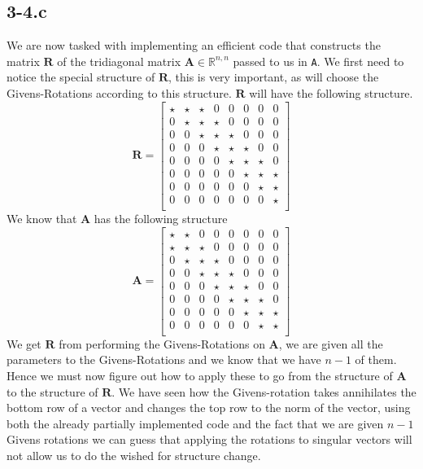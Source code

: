 \documentclass{article}
\begin{document}
\subsection*{3-4.c}
We are now tasked with implementing an efficient code that constructs the matrix $\mathbf{R}$ of the tridiagonal matrix $\mathbf{A} \in \mathbb{R}^{n,n}$ passed to us in \verb|A|. We first need to notice the special structure of $\mathbf{R}$, this is very important, as will choose the Givens-Rotations according to this structure. $\mathbf{R}$ will have the following structure.
\begin{equation*}
\mathbf{R} =
    \begin{bmatrix}
        \star & \star & \star & 0 & 0 & 0 & 0 & 0 \\
        0 & \star & \star & \star & 0 & 0 & 0 & 0 \\
        0 & 0 & \star & \star & \star & 0 & 0 & 0 \\
        0 & 0 & 0 & \star & \star & \star & 0 & 0 \\
         0 & 0 & 0 & 0 & \star & \star & \star & 0 \\
         0 & 0 & 0 & 0 & 0 & \star & \star & \star \\
         0 & 0 & 0 & 0 & 0 & 0& \star & \star \\
         0 & 0 & 0 & 0 & 0 & 0& 0 & \star \\
    \end{bmatrix}
\end{equation*}
We know that $\mathbf{A}$ has the following structure
\begin{equation*}
    \mathbf{A} = 
    \begin{bmatrix}
    \star & \star &0 & 0 & 0 & 0 & 0 & 0 \\
        \star & \star & \star & 0& 0 & 0 & 0 & 0 \\
        0 & \star & \star & \star & 0 & 0 & 0 & 0 \\
        0 & 0 & \star & \star & \star & 0 & 0 & 0 \\
         0 & 0 & 0 & \star & \star & \star & 0  & 0 \\
         0 & 0 & 0 & 0 & \star & \star & \star & 0\\
         0 & 0 & 0 & 0 & 0 & \star& \star & \star \\
         0 & 0 & 0 & 0 & 0 & 0& \star & \star \\
    \end{bmatrix}
\end{equation*}
We get $\mathbf{R}$ from performing the Givens-Rotations on $\mathbf{A}$, we are given all the parameters to the Givens-Rotations and we know that we have $n-1$ of them. Hence we must now figure out how to apply these to go from the structure of $\mathbf{A}$ to the structure of $\mathbf{R}$. We have seen how the Givens-rotation takes annihilates the bottom row of a vector and changes the top row to the norm of the vector, using both the already partially implemented code and the fact that we are given $n-1$ Givens rotations we can guess that applying the rotations to singular vectors will not allow us to do the wished for structure change.
\end{document}
